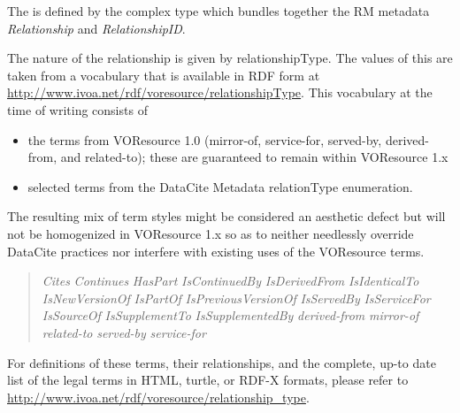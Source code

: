 \documentclass[11pt,a4paper]{ivoa}
\begin{document}


The  is defined by the
 complex type which bundles together the
RM metadata \emph{Relationship} and
\emph{RelationshipID}.  

The nature of the relationship is given by relationshipType.  The values
of this are taken from a vocabulary that is available in RDF form at
\url{http://www.ivoa.net/rdf/voresource/relationshipType}.  This
vocabulary at the time of writing consists of 

\begin{itemize}
\item the terms from VOResource 1.0 (mirror-of, service-for, served-by,
derived-from, and related-to); these are guaranteed to remain within
VOResource 1.x
\item selected terms from the DataCite Metadata relationType enumeration.
\end{itemize}

The resulting mix of term styles might be considered an aesthetic defect
but will not be homogenized in VOResource 1.x so as to neither
needlessly override DataCite practices nor interfere with existing uses
of the VOResource terms.

\begin{quotation}\noindent
\textsl{Cites}
\textsl{Continues}
\textsl{HasPart}
\textsl{IsContinuedBy}
\textsl{IsDerivedFrom}
\textsl{IsIdenticalTo}
\textsl{IsNewVersionOf}
\textsl{IsPartOf}
\textsl{IsPreviousVersionOf}
\textsl{IsServedBy}
\textsl{IsServiceFor}
\textsl{IsSourceOf}
\textsl{IsSupplementTo}
\textsl{IsSupplementedBy}
\textsl{derived-from}
\textsl{mirror-of}
\textsl{related-to}
\textsl{served-by}
\textsl{service-for}

\end{quotation}

For definitions of these terms, their relationships, and the complete,
up-to date list of the legal terms in HTML, turtle, or RDF-X formats,
please refer to \url{http://www.ivoa.net/rdf/voresource/relationship_type}.
\end{document}
